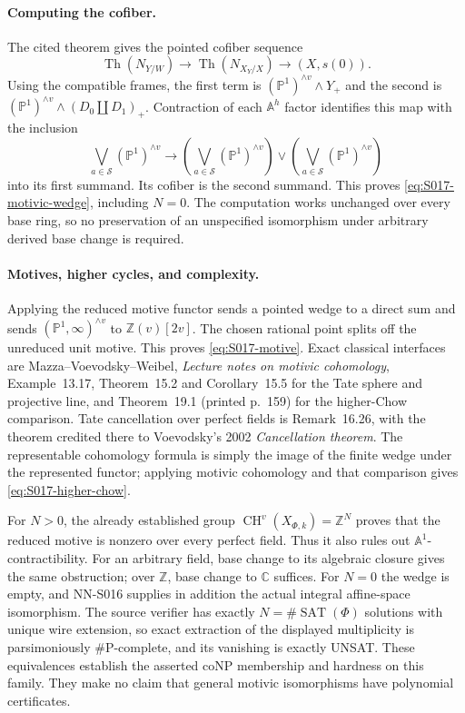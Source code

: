 \paragraph{Computing the cofiber.}
The cited theorem gives the pointed cofiber sequence
\[
 \operatorname{Th}(N_{Y/W})\longrightarrow
 \operatorname{Th}(N_{X_Y/X})\longrightarrow (X,s(0)).
\]
Using the compatible frames, the first term is
$(\mathbb P^1)^{\wedge v}\wedge Y_+$ and the second is
$(\mathbb P^1)^{\wedge v}\wedge(D_0\amalg D_1)_+$.
Contraction of each $\mathbb A^h$ factor identifies this map with the
inclusion
\[
 \bigvee_{a\in\mathcal S}(\mathbb P^1)^{\wedge v}
 \longrightarrow
 \left(\bigvee_{a\in\mathcal S}(\mathbb P^1)^{\wedge v}\right)
 \vee\left(\bigvee_{a\in\mathcal S}(\mathbb P^1)^{\wedge v}\right)
\]
into its first summand. Its cofiber is the second summand. This proves
\eqref{eq:S017-motivic-wedge}, including $N=0$. The computation works
unchanged over every base ring, so no preservation of an unspecified
isomorphism under arbitrary derived base change is required.

\paragraph{Motives, higher cycles, and complexity.}
Applying the reduced motive functor sends a pointed wedge to a direct
sum and sends $(\mathbb P^1,\infty)^{\wedge v}$ to
$\mathbb Z(v)[2v]$. The chosen rational point splits off the unreduced
unit motive. This proves \eqref{eq:S017-motive}. Exact classical
interfaces are Mazza--Voevodsky--Weibel, \emph{Lecture notes on motivic
cohomology}, Example~13.17, Theorem~15.2 and Corollary~15.5 for the
Tate sphere and projective line, and Theorem~19.1 (printed p.~159) for
the higher-Chow comparison. Tate cancellation over perfect fields is
Remark~16.26, with the theorem credited there to Voevodsky's 2002
\emph{Cancellation theorem}. The representable cohomology formula is
simply the image of the finite wedge under the represented functor;
applying motivic cohomology and that comparison gives
\eqref{eq:S017-higher-chow}.

For $N>0$, the already established group
$\operatorname{CH}^v(X_{\Phi,k})=\mathbb Z^N$ proves that the reduced
motive is nonzero over every perfect field. Thus it also rules out
$\mathbb A^1$-contractibility. For an arbitrary field, base change to
its algebraic closure gives the same obstruction; over $\mathbb Z$,
base change to $\mathbb C$ suffices. For $N=0$ the wedge is empty, and
NN-S016 supplies in addition the actual integral affine-space
isomorphism. The source verifier has exactly $N=\#\operatorname{SAT}(\Phi)$
solutions with unique wire extension, so exact extraction of the
displayed multiplicity is parsimoniously \#P-complete, and its
vanishing is exactly UNSAT. These equivalences establish the asserted
coNP membership and hardness on this family. They make no claim that
general motivic isomorphisms have polynomial certificates.

